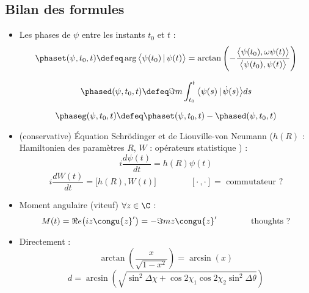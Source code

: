 \subsection{Bilan des formules}

\begin{itemize}
	\item Les phases de $\psi$ entre les instants $t_0$ et $t$ :
	\begin{equation}\label{eq:phase_tot}
		\phaset(\psi, t_0, t) \defeq \arg\big\langle\psi(t_0) \,|\, \psi(t)\big\rangle = \arctan \left( -\frac{\big\langle\psi(t_0), \omega\psi(t)\big\rangle}{\big\langle\psi(t_0), \psi(t)\big\rangle} \right)
	\end{equation}
	
	\begin{equation}\label{eq:phase_dyn}
		\phased(\psi,t_0,t) \defeq \Im m \int_{t_0}^t\big\langle \psi(s) \,|\, \dot{\psi}(s) \big\rangle ds
	\end{equation}
	
	\begin{equation}\label{eq:phase_geo}
		\phaseg(\psi, t_0, t) \defeq \phaset(\psi, t_0, t) - \phased(\psi,t_0,t)
	\end{equation}
	
	\item (conservative) Équation Schrödinger et de Liouville-von Neumann ($h(R)$ : Hamiltonien des paramètres $R$, $W$ : opérateurs statistique ) \cite[p.6]{bohm_geometric_2003} :
	\begin{equation}\label{eq:schrodinger}
		i\frac{d \psi(t)}{dt} = h(R)\psi(t)
	\end{equation}
	\begin{equation}\label{eq:liouville-neumann}
		i\frac{d W(t)}{dt} = \big[h(R),W(t)\big] \qquad\qquad [\cdot\,,\cdot]=\text{ commutateur ?}
	\end{equation}
	
	\item Moment angulaire (viteuf) $\forall z\in\C$ :
	\begin{equation}\label{eq:mom_angu}
		M(t) = \Re e \big(iz\congu{z}'\big) = -\Im m z\congu{z}'  \qquad\qquad \text{thoughts ?}
	\end{equation}
	
	\item Directement :
	\[\arctan\left( \frac{x}{\sqrt{1-x^2}}\right) = \arcsin(x)\]
	\[d = \arcsin\left(\sqrt{\sin^2\Delta\chi + \cos2\chi_1 \cos2\chi_2 \sin^2\Delta\theta}\right)\]
	
\end{itemize}


